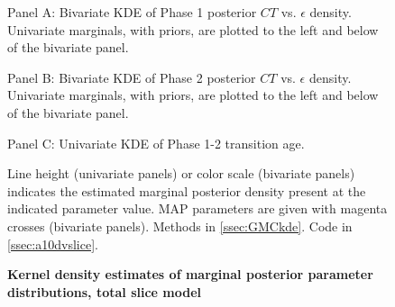 \documentclass{ut-thesis}
\begin{document}
\begin{NoHyper}
\begin{figure}[!h]
    \caption{{\bf Kernel density estimates of marginal posterior parameter distributions, total slice model}}
    Panel A: Bivariate KDE of Phase 1 posterior $CT$ vs. $\epsilon$ density. Univariate marginals, with priors, are plotted to the left and below of the bivariate panel.

    Panel B: Bivariate KDE of Phase 2 posterior $CT$ vs. $\epsilon$ density. Univariate marginals, with priors, are plotted to the left and below of the bivariate panel.

    Panel C: Univariate KDE of Phase 1-2 transition age.

    Line height (univariate panels) or color scale (bivariate panels) indicates the estimated marginal posterior density present at the indicated parameter value. MAP parameters are given with magenta crosses (bivariate panels).
    \label{dvmarginals}
    Methods in \autoref{ssec:GMCkde}.
    Code in \autoref{ssec:a10dvslice}.    
\end{figure}


\end{NoHyper}
\end{document}
